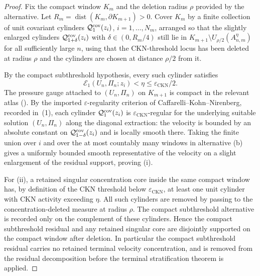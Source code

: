 \documentclass[11pt]{amsart}
\numberwithin{equation}{section}
\theoremstyle{plain}
\theoremstyle{definition}
\theoremstyle{remark}
\newcommand{\eps}{\varepsilon}
\newcommand{\CKN}{\mathrm{CKN}}
\newcommand{\dist}{\operatorname{dist}}
\newcommand{\calE}{\mathcal E}
\begin{document}
\begin{proof}
Fix the compact window \(K_m\) and the deletion radius \(\rho\) provided by
the alternative.  Let \(R_m=\dist(K_m,\partial K_{m+1})>0\).  Cover
\(K_m\) by a finite collection of unit covariant cylinders
\(\mathcal Q_1^{\rm cov}(z_i)\), \(i=1,\dots,N_m\), arranged so that the
slightly enlarged cylinders \(\mathcal Q_{1+\delta}^{\rm cov}(z_i)\) with
\(\delta\in(0,R_m/4)\) still lie in \(K_{m+1}\setminus
U_{\rho/2}(A_{n,m}^{\eta})\) for all sufficiently large \(n\), using that the
CKN-threshold locus has been deleted at radius \(\rho\) and the cylinders are
chosen at distance \(\rho/2\) from it.

By the compact subthreshold hypothesis, every such cylinder satisfies
\[
   \calE_1(U_n,\Pi_n;z_i)
   <\eta\le \eps_{\CKN}/2 .
\]
The pressure gauge attached to \((U_n,\Pi_n)\) on \(K_{m+1}\) is compact in
the relevant atlas
().  By the imported \(\eps\)-regularity criterion
of Caffarelli--Kohn--Nirenberg, recorded in
\,(1), each cylinder
\(\mathcal Q_1^{\rm cov}(z_i)\) is \(\eps_{\CKN}\)-regular for the
underlying suitable solution \((U_n,\Pi_n)\) along the diagonal extraction:
the velocity is bounded by an absolute constant on
\(\mathcal Q_{1-\delta}^{\rm cov}(z_i)\) and is locally smooth there.  Taking the
finite union over \(i\) and over the at most countably many windows in
alternative \textup{(b)} gives a uniformly bounded smooth representative of
the velocity on a slight enlargement of the residual support, proving
\textup{(i)}.

For \textup{(ii)}, a retained singular concentration core inside the same
compact window has, by definition of the CKN threshold below
\(\eps_{\CKN}\), at least one unit cylinder with CKN activity exceeding
\(\eta\).  All such cylinders are removed by passing to the
concentration-deleted measure at radius \(\rho\).  The compact subthreshold
alternative is recorded only on the complement of these cylinders.  Hence
the compact subthreshold residual and any retained singular core are
disjointly supported on the compact window after deletion.  In particular
the compact subthreshold residual carries no retained terminal velocity
concentration, and is removed from the residual decomposition before the
terminal stratification theorem
 is applied.
\end{proof}
\end{document}
